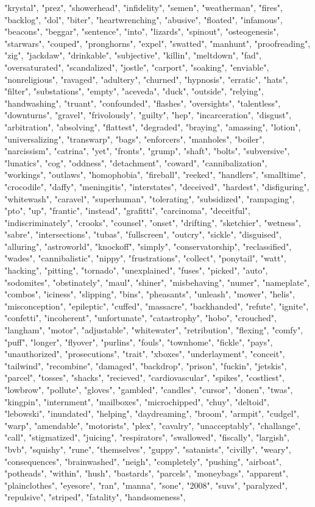 "krystal", "prez", "showerhead", "infidelity", "semen", "weatherman", "fires", "backlog", "dol", "biter", "heartwrenching", "abusive", "floated", "infamous", "beacons", "beggar", "sentence", "into", "lizards", "spinout", "osteogenesis", "starwars", "couped", "pronghorns", "expel", "swatted", "manhunt", "proofreading", "zig", "jackdaw", "drinkable", "subjective", "killin", "meltdown", "fad", "oversaturated", "scandalized", "jostle", "carport", "soaking", "enviable", "nonreligious", "ravaged", "adultery", "churned", "hypnosis", "erratic", "hats", "filter", "substations", "empty", "aceveda", "duck", "outside", "relying", "handwashing", "truant", "confounded", "flashes", "oversights", "talentless", "downturns", "gravel", "frivolously", "guilty", "hep", "incarceration", "disgust", "arbitration", "absolving", "flattest", "degraded", "braying", "amassing", "lotion", "universalizing", "transwarp", "bags", "enforcers", "manholes", "boiler", "narcissism", "catrina", "yet", "fronts", "grump", "shaft", "bolts", "subversive", "lunatics", "cog", "oddness", "detachment", "coward", "cannibalization", "workings", "outlaws", "homophobia", "fireball", "reeked", "handlers", "smalltime", "crocodile", "daffy", "meningitis", "interstates", "deceived", "hardest", "disfiguring", "whitewash", "caravel", "superhuman", "tolerating", "subsidized", "rampaging", "pto", "up", "frantic", "instead", "grafitti", "carcinoma", "deceitful", "indiscriminately", "crooks", "counsel", "onset", "drifting", "sketchier", "wetness", "sabre", "intersections", "tubas", "fullscreen", "outcry", "sickle", "disguised", "alluring", "astroworld", "knockoff", "simply", "conservatorship", "reclassified", "wades", "cannibalistic", "nippy", "frustrations", "collect", "ponytail", "watt", "hacking", "pitting", "tornado", "unexplained", "fuses", "picked", "auto", "sodomites", "obstinately", "maul", "shiner", "misbehaving", "numer", "nameplate", "combos", "iciness", "slipping", "bins", "pheasants", "unleash", "mower", "helis", "misconception", "epileptic", "cuffed", "massacre", "backhanded", "refute", "ignite", "confetti", "incoherent", "unfortunate", "catastrophy", "hobo", "crouched", "langham", "motor", "adjustable", "whitewater", "retribution", "flexing", "comfy", "puff", "longer", "flyover", "purlins", "fouls", "townhome", "fickle", "pays", "unauthorized", "prosecutions", "trait", "xboxes", "underlayment", "conceit", "tailwind", "recombine", "damaged", "backdrop", "prison", "fuckin", "jetskis", "parcel", "tosses", "shacks", "recieved", "cardiovascular", "spikes", "costliest", "lowbrow", "pollute", "gloves", "gambled", "candles", "cursor", "donen", "twas", "kingpin", "internment", "mailboxes", "microchipped", "chuy", "deltoid", "lebowski", "inundated", "helping", "daydreaming", "broom", "armpit", "cudgel", "warp", "amendable", "motorists", "plex", "cavalry", "unacceptably", "challange", "call", "stigmatized", "juicing", "respirators", "swallowed", "fiscally", "largish", "bvb", "squishy", "rune", "themselves", "guppy", "satanists", "civilly", "weary", "consequences", "brainwashed", "neigh", "completely", "pushing", "airboat", "potheads", "within", "hush", "bastards", "parcels", "moneybags", "apparent", "plainclothes", "eyesore", "ran", "manna", "sone", "2008", "suvs", "paralyzed", "repulsive", "striped", "fatality", "handsomeness", 